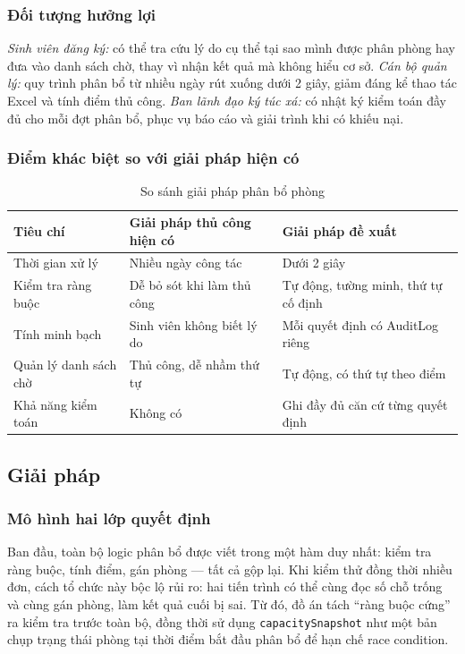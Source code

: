 \documentclass[../DoAn.tex]{subfiles}
\begin{document}
\subsubsection{Đối tượng hưởng lợi}

\textit{Sinh viên đăng ký:} có thể tra cứu lý do cụ thể tại sao mình được
phân phòng hay đưa vào danh sách chờ, thay vì nhận kết quả mà không hiểu cơ
sở. \textit{Cán bộ quản lý:} quy trình phân bổ từ nhiều ngày rút xuống dưới
2 giây, giảm đáng kể thao tác Excel và tính điểm thủ công. \textit{Ban
lãnh đạo ký túc xá:} có nhật ký kiểm toán đầy đủ cho mỗi đợt phân bổ, phục
vụ báo cáo và giải trình khi có khiếu nại.

\subsubsection{Điểm khác biệt so với giải pháp hiện có}

\begin{table}[H]
\centering
\caption{So sánh giải pháp phân bổ phòng}
\label{tab:alloc_comparison}
\small
\begin{tabular}{|p{3.5cm}|p{4.5cm}|p{4.8cm}|}
\hline
\textbf{Tiêu chí} & \textbf{Giải pháp thủ công hiện có} & \textbf{Giải pháp đề xuất} \\
\hline
Thời gian xử lý & Nhiều ngày công tác & Dưới 2 giây \\
\hline
Kiểm tra ràng buộc & Dễ bỏ sót khi làm thủ công & Tự động, tường minh, thứ tự cố định \\
\hline
Tính minh bạch & Sinh viên không biết lý do & Mỗi quyết định có AuditLog riêng \\
\hline
Quản lý danh sách chờ & Thủ công, dễ nhầm thứ tự & Tự động, có thứ tự theo điểm \\
\hline
Khả năng kiểm toán & Không có & Ghi đầy đủ căn cứ từng quyết định \\
\hline
\end{tabular}
\end{table}

\subsection{Giải pháp}
\label{subsec:alloc_model}

\subsubsection{Mô hình hai lớp quyết định}

Ban đầu, toàn bộ logic phân bổ được viết trong một hàm duy nhất: kiểm tra
ràng buộc, tính điểm, gán phòng --- tất cả gộp lại. Khi kiểm thử đồng thời
nhiều đơn, cách tổ chức này bộc lộ rủi ro: hai tiến trình có thể cùng đọc số
chỗ trống và cùng gán phòng, làm kết quả cuối bị sai. Từ đó, đồ án tách
``ràng buộc cứng'' ra kiểm tra trước toàn bộ, đồng thời sử dụng
\texttt{capacitySnapshot} như một bản chụp trạng thái phòng tại thời điểm bắt
đầu phân bổ để hạn chế race condition.
\end{document}
